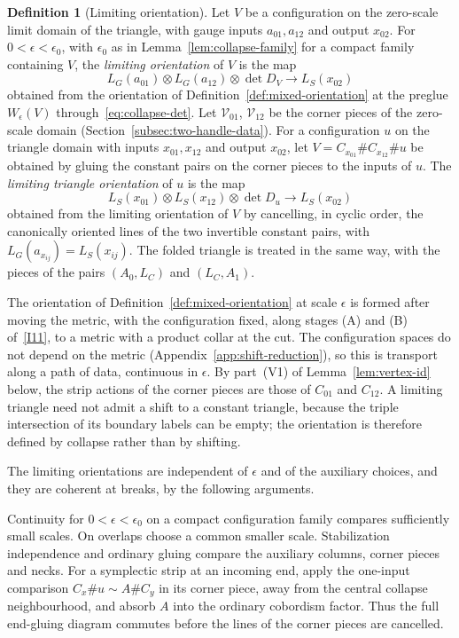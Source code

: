 \documentclass[11pt]{amsart}
\theoremstyle{definition}
\newtheorem{definition}[theorem]{Definition}
\theoremstyle{remark}
\theoremstyle{plain}
\numberwithin{equation}{section}
\begin{document}
\begin{definition}[Limiting orientation]\label{def:limit-orientation}
Let $V$ be a configuration on the zero-scale limit domain of the
triangle, with gauge inputs $a_{01},a_{12}$ and output $x_{02}$. For
$0<\epsilon<\epsilon_0$, with $\epsilon_0$ as in
Lemma~\ref{lem:collapse-family} for a compact family containing $V$, the
\emph{limiting orientation} of $V$ is the map
\[
 L_G(a_{01})\otimes L_G(a_{12})\otimes\det D_V\longrightarrow L_S(x_{02})
\]
obtained from the orientation of Definition~\ref{def:mixed-orientation}
at the preglue $W_\epsilon(V)$ through~\eqref{eq:collapse-det}. Let
$\mathcal V_{01}$, $\mathcal V_{12}$ be the corner pieces of the zero-scale
domain (Section~\ref{subsec:two-handle-data}).
For a configuration $u$ on the triangle domain with inputs
$x_{01},x_{12}$ and output $x_{02}$, let $V=C_{x_{01}}\#C_{x_{12}}\#u$ be
obtained by gluing the constant pairs on the corner pieces to the
inputs of $u$. The \emph{limiting triangle orientation} of $u$ is the map
\[
 L_S(x_{01})\otimes L_S(x_{12})\otimes\det D_u\longrightarrow L_S(x_{02})
\]
obtained from the limiting orientation of $V$ by cancelling, in cyclic
order, the canonically oriented lines of the two invertible constant
pairs, with $L_G(a_{x_{ij}})=L_S(x_{ij})$. The folded triangle is treated
in the same way, with the pieces of the pairs $(A_0,L_C)$ and
$(L_C,A_1)$.
\end{definition}

The orientation of Definition~\ref{def:mixed-orientation} at scale
$\epsilon$ is formed after moving the metric, with the configuration
fixed, along stages (A) and (B) of~\ref{I11}, to a metric with a
product collar at the cut. The
configuration spaces do not depend on the metric
(Appendix~\ref{app:shift-reduction}), so this is transport along a path
of data, continuous in $\epsilon$. By part~(V1) of
Lemma~\ref{lem:vertex-id} below, the strip actions of the corner
pieces are those of $C_{01}$ and $C_{12}$. A limiting triangle need not
admit a shift to a constant triangle, because the triple intersection of
its boundary labels can be empty; the orientation is therefore defined by
collapse rather than by shifting.

The limiting orientations are independent of $\epsilon$ and of the
auxiliary choices, and they are coherent at breaks, by the following
arguments.

Continuity for $0<\epsilon<\epsilon_0$ on a compact configuration
family compares sufficiently small scales. On overlaps choose a
common smaller scale. Stabilization independence and ordinary
gluing compare the auxiliary columns, corner pieces and necks.
For a symplectic strip at an incoming end, apply the one-input
comparison $C_x\#u\sim A\#C_y$ in its corner piece, away from
the central collapse neighbourhood, and absorb $A$ into the ordinary
cobordism factor. Thus the full end-gluing diagram commutes before
the lines of the corner pieces are cancelled.
\end{document}
